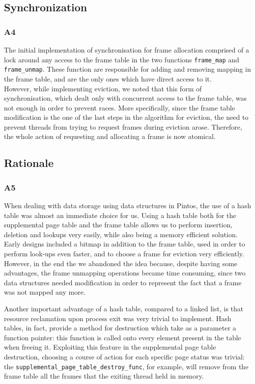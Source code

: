 \documentclass[a4wide, 11pt]{article}
\newcommand{\tx}{\texttt}
\begin{document}
\subsection{Synchronization}
\subsubsection{A4}
The initial implementation of synchronisation for frame allocation comprised of a lock around any access to the frame table in the two functions \tx{frame\_map} and \tx{frame\_unmap}. These function are responsible for adding and removing mapping in the frame table, and are the only ones which have direct access to it. \\
However, while implementing eviction, we noted that this form of synchronisation, which dealt only with concurrent access to the frame table, was not enough in order to prevent races. More specifically, since the frame table modification is the one of the last steps in the algorithm for eviction, the need to prevent threads from trying to request frames during eviction arose. Therefore, the whole action of requesting and allocating a frame is now atomical.
\subsection{Rationale}
\subsubsection{A5}
When dealing with data storage using data structures in Pintos, the use of a hash table was almost an immediate choice for us. Using a hash table both for the supplemental page table and the frame table allows us to perform insertion, deletion and lookups very easily, while also being a memory efficient solution. Early designs included a bitmap in addition to the frame table, used in order to perform look-ups even faster, and to choose a frame for eviction very efficiently. However, in the end the we abandoned the idea because, despite having some advantages, the frame unmapping operations became time consuming, since two data structures needed modification in order to represent the fact that a frame was not mapped any more.

Another important advantage of a hash table, compared to a linked  list, is that resource reclamation upon process exit was very trivial to implement. Hash tables, in fact, provide a method for destruction which take as a parameter a function pointer: this function is called onto every  element present in the table when freeing it. Exploiting this feature in the supplemental page table destruction, choosing a course of action for each specific page status was trivial: the \tx{supplemental\_page\_table\_destroy\_func}, for example, will remove from the frame table all the frames that the exiting thread held in memory.
\end{document}
